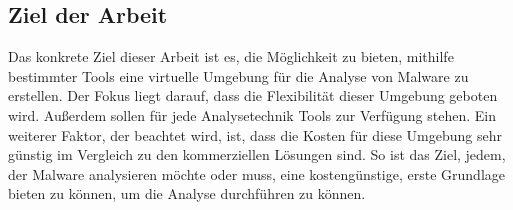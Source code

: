 \subsection{Ziel der Arbeit}
Das konkrete Ziel dieser Arbeit ist es, die Möglichkeit zu bieten, mithilfe bestimmter Tools eine virtuelle Umgebung für die Analyse von Malware zu erstellen. Der Fokus liegt darauf, dass die Flexibilität dieser Umgebung geboten wird. Außerdem sollen für jede Analysetechnik Tools zur Verfügung stehen. Ein weiterer Faktor, der beachtet wird, ist, dass die Kosten für diese Umgebung sehr günstig im Vergleich zu den kommerziellen Lösungen sind. So ist das Ziel, jedem, der Malware analysieren möchte oder muss, eine kostengünstige, erste Grundlage bieten zu können, um die Analyse durchführen zu können.